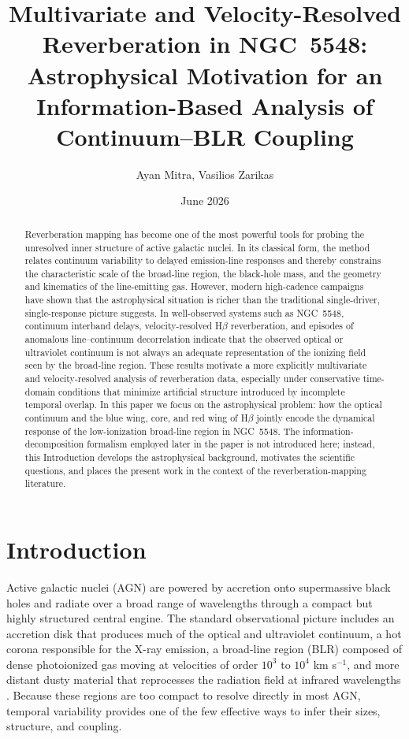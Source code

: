 \documentclass[12pt, a4paper]{article}
\title 
{Multivariate and Velocity-Resolved Reverberation in NGC~5548:\\
Astrophysical Motivation for an Information-Based Analysis of Continuum--BLR Coupling}
\author{ Ayan Mitra, Vasilios Zarikas}
\date{June 2026}
\begin{document}
\maketitle



\begin{abstract}
Reverberation mapping has become one of the most powerful tools for probing the unresolved inner structure of active galactic nuclei. In its classical form, the method relates continuum variability to delayed emission-line responses and thereby constrains the characteristic scale of the broad-line region, the black-hole mass, and the geometry and kinematics of the line-emitting gas. However, modern high-cadence campaigns have shown that the astrophysical situation is richer than the traditional single-driver, single-response picture suggests. In well-observed systems such as NGC~5548, continuum interband delays, velocity-resolved H$\beta$ reverberation, and episodes of anomalous line--continuum decorrelation indicate that the observed optical or ultraviolet continuum is not always an adequate representation of the ionizing field seen by the broad-line region. These results motivate a more explicitly multivariate and velocity-resolved analysis of reverberation data, especially under conservative time-domain conditions that minimize artificial structure introduced by incomplete temporal overlap. In this paper we focus on the astrophysical problem: how the optical continuum and the blue wing, core, and red wing of H$\beta$ jointly encode the dynamical response of the low-ionization broad-line region in NGC~5548. The information-decomposition formalism employed later in the paper is not introduced here; instead, this Introduction develops the astrophysical background, motivates the scientific questions, and places the present work in the context of the reverberation-mapping literature.
\end{abstract}








\section{Introduction}

Active galactic nuclei (AGN) are powered by accretion onto supermassive black holes and radiate over a broad range of wavelengths through a compact but highly structured central engine. The standard observational picture includes an accretion disk that produces much of the optical and ultraviolet continuum, a hot corona responsible for the X-ray emission, a broad-line region (BLR) composed of dense photoionized gas moving at velocities of order \(10^3\) to \(10^4\) km s\(^{-1}\), and more distant dusty material that reprocesses the radiation field at infrared wavelengths \cite{Peterson2004,Netzer2013,Cackett2021}. Because these regions are too compact to resolve directly in most AGN, temporal variability provides one of the few effective ways to infer their sizes, structure, and coupling.
\end{document}
